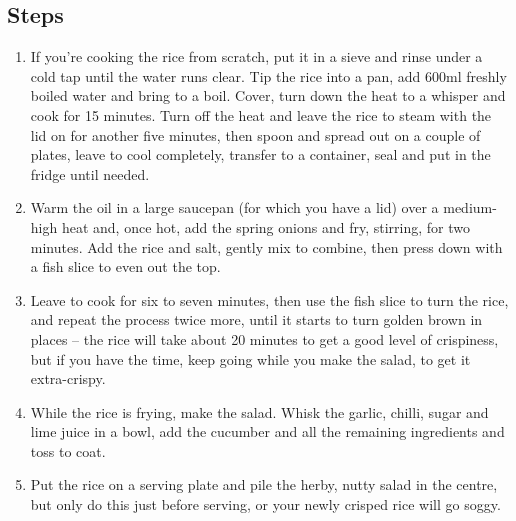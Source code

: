 \documentclass{book}
\begin{document}
\subsection*{Steps}
\begin{enumerate}
\item If you’re cooking the rice from scratch, put it in a sieve and rinse under a cold tap until the water runs clear. Tip the rice into a pan, add 600ml freshly boiled water and bring to a boil. Cover, turn down the heat to a whisper and cook for 15 minutes. Turn off the heat and leave the rice to steam with the lid on for another five minutes, then spoon and spread out on a couple of plates, leave to cool completely, transfer to a container, seal and put in the fridge until needed.
\item Warm the oil in a large saucepan (for which you have a lid) over a medium-high heat and, once hot, add the spring onions and fry, stirring, for two minutes. Add the rice and salt, gently mix to combine, then press down with a fish slice to even out the top.
\item Leave to cook for six to seven minutes, then use the fish slice to turn the rice, and repeat the process twice more, until it starts to turn golden brown in places – the rice will take about 20 minutes to get a good level of crispiness, but if you have the time, keep going while you make the salad, to get it extra-crispy.
\item While the rice is frying, make the salad. Whisk the garlic, chilli, sugar and lime juice in a bowl, add the cucumber and all the remaining ingredients and toss to coat.
\item Put the rice on a serving plate and pile the herby, nutty salad in the centre, but only do this just before serving, or your newly crisped rice will go soggy.
\end{enumerate}
\newpage
\end{document}
